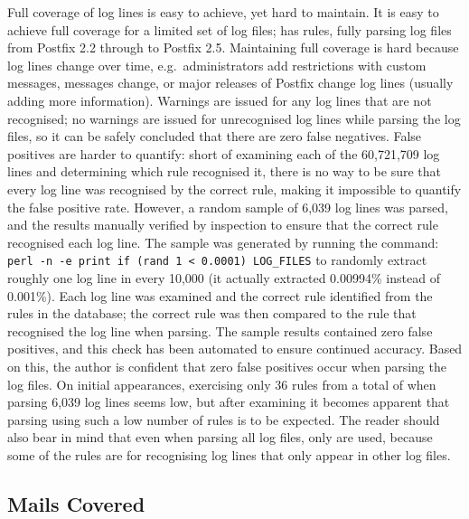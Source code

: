 Full coverage of log lines is easy to achieve, yet hard to maintain.  It is
easy to achieve full coverage for a limited set of log files; \parsername{}
has \numberOFrules{} rules, fully parsing \numberOFlogFILESall{} log files
from Postfix 2.2 through to Postfix 2.5.  Maintaining full coverage is hard
because log lines change over time, e.g.\ administrators add restrictions
with custom messages,  messages change, or major releases of
Postfix change log lines (usually adding more information).  Warnings are
issued for any log lines that are not recognised; no warnings are issued
for unrecognised log lines while parsing the \numberOFlogFILES{} log files,
so it can be safely concluded that there are zero false negatives.  False
positives are harder to quantify: short of examining each of the 60,721,709
log lines and determining which rule recognised it, there is no way to be
sure that every log line was recognised by the correct rule, making it
impossible to quantify the false positive rate.  However, a random sample
of 6,039 log lines was parsed, and the results manually verified by
inspection to ensure that the correct rule recognised each log line.  The
sample was generated by running the command: \texttt{perl -n -e
\singlequote{}print if (rand 1 < 0.0001)\singlequote{} LOG\_FILES} to
randomly extract roughly one log line in every 10,000 (it actually
extracted 0.00994\% instead of 0.001\%).  Each log line was examined and
the correct rule identified from the \numberOFrules{} rules in the
database; the correct rule was then compared to the rule that recognised
the log line when parsing.  The sample results contained zero false
positives, and this check has been automated to ensure continued accuracy.
Based on this, the author is confident that zero false positives occur when
parsing the \numberOFlogFILES{} log files.  On initial appearances,
exercising only 36 rules from a total of \numberOFrules{} when parsing
6,039 log lines seems low, but after examining 
it becomes apparent that parsing using such a low number of rules is to be
expected.  The reader should also bear in mind that even when parsing all
\numberOFlogFILES{} log files, only \numberOFrulesMINIMUM{} are used,
because some of the rules are for recognising log lines that only appear in
other log files.

\subsection{Mails Covered}

